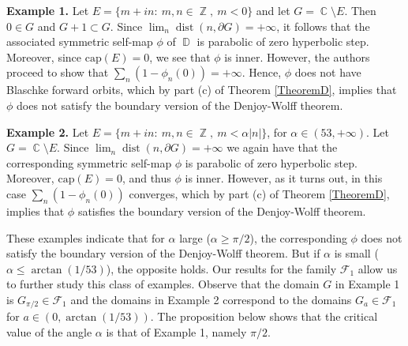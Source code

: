 \documentclass[11pt, letterpaper,leqno]{amsart}
\numberwithin{equation}{section}
\theoremstyle{definition}
\DeclareMathOperator{\D}{\mathbb{D}}
\DeclareMathOperator{\C}{\mathbb{C}}
\DeclareMathOperator{\Z}{\mathbb{Z}}
\DeclareMathOperator{\dist}{\mathrm{dist}}
\begin{document}
  \medskip
  
\textbf{Example 1.}
 Let $E=\{m+in:\ m,n\in\Z,\ m<0\}$ and let $G=\C\setminus E$. Then $0\in G$ and $G+1\subset G$. Since $\lim_{n}\dist(n,\partial G)= +\infty$, it follows that the associated symmetric self-map $\phi$ of $\D$ is parabolic of zero hyperbolic step. Moreover, since $\text{cap}(E)=0$, we see that $\phi$ is inner. However, the authors proceed to show that $\sum_n\left(1-\phi_n(0)\right)=+\infty$. Hence, $\phi$ does not have Blaschke forward orbits, which by part (c) of Theorem \ref{TheoremD}, implies that $\phi$ does not satisfy the boundary version of the Denjoy-Wolff theorem.
 
 \medskip
 
 \textbf{Example 2.}
Let $E=\{m+in:\ m,n\in\Z,\ m<\alpha|n|\}$, for $\alpha\in (53,+\infty)$. Let $G=\C\setminus E$. Since $\lim_{n}\dist(n,\partial G)= +\infty$ we again have that the corresponding symmetric self-map $\phi$ is parabolic of zero hyperbolic step. Moreover, $\text{cap}(E)=0$, and thus $\phi$ is inner. However, as it turns out, in this case $\sum_n\left(1-\phi_n(0)\right)$ converges, which by part (c) of Theorem \ref{TheoremD}, implies that $\phi$ satisfies the boundary version of the Denjoy-Wolff theorem.

\medskip

These examples indicate that for $\alpha$ large ($\alpha\geq \pi/2$),
the corresponding $\phi$ does not satisfy the boundary version of the Denjoy-Wolff theorem. But if  $\alpha$ is small ($\alpha\leq \arctan(1/53)$), the opposite holds. 
Our results for the family $\mathcal{F}_1$ allow us to further study this class of examples. Observe that the domain $G$ in Example 1 is $G_{\pi/2}\in\mathcal{F}_1$ and the domains in Example 2 correspond to the domains $G_a\in\mathcal{F}_1$ for $a\in (0,\arctan(1/53))$.
The proposition below shows that the critical value of the angle $\alpha$ is
that of Example 1, namely $\pi/2$. 
\end{document}
